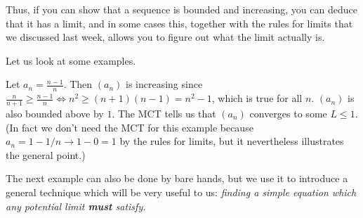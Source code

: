 \documentclass[11pt,dvipsnames]{book}
\numberwithin{figure}{section} %
\numberwithin{table}{section} %
\begin{document}
\medskip
Thus, if you can show that a sequence is bounded and increasing, you can deduce that it has a limit, and in some cases this, together with the rules for limits that we discussed last week, allows you to figure out what the limit actually is.
%
%

\medskip
Let us look at some examples.
\begin{example}
Let $a_n= \frac{n-1}{n}$. Then $(a_n)$ is increasing since $\frac{n}{n+1} \geq \frac{n-1}{n} \iff n^2 \geq (n+1)(n-1) = n^2 -1$, which is true for all $n$. $(a_n)$ is also bounded above by $1$. The MCT tells us that $(a_n)$ converges to some $L \leq 1$. (In fact we don't need the MCT for this example because $ a_n = 1 - 1/n \to 1 - 0 = 1$ by the rules for limits, but it nevertheless illustrates the general point.)
\end{example}
The next example can also be done by bare hands, but we use it to introduce a general technique which will be very useful to us: {\em finding a simple equation which any potential limit {\bf must} satisfy.}
\end{document}
